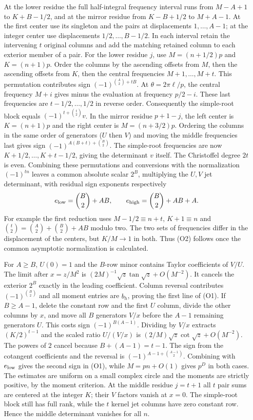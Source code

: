\documentclass[11pt,a4paper]{article}
\begin{document}
At the lower residue the full half-integral frequency interval runs from $M-A+1$ to $K+B-1/2$, and at the mirror residue from $K-B+1/2$ to $M+A-1$. At the first center use its singleton and the pairs at displacements $1,\ldots,A-1$; at the integer center use displacements $1/2,\ldots,B-1/2$. In each interval retain the intervening $t$ original columns and add the matching retained column to each exterior member of a pair. For the lower residue $j$, use $M=(n+1/2)p$ and $K=(n+1)p$. Order the columns by the ascending offsets from $M$, then the ascending offsets from $K$, then the central frequencies $M+1,\ldots,M+t$. This permutation contributes sign $(-1)^{\binom A2+tB}$. At $\theta=2\pi\ell/p$, the central frequency $M+i$ gives minus the evaluation at frequency $p/2-i$. These last frequencies are $t-1/2,\ldots,1/2$ in reverse order. Consequently the simple-root block equals $(-1)^{t+\binom t2}v$. In the mirror residue $p+1-j$, the left center is $K=(n+1)p$ and the right center is $M=(n+3/2)p$. Ordering the columns in the same order of generators ($U$ then $V$) and moving the middle frequencies last gives sign $(-1)^{A(B+t)+\binom B2}$. The simple-root frequencies are now $K+1/2,\ldots,K+t-1/2$, giving the determinant $v$ itself. The Christoffel degree $2t$ is even. Combining these permutations and conversions with the normalization $(-1)^{tn}$ leaves a common absolute scalar $2^B$, multiplying the $U,V$ jet determinant, with residual sign exponents respectively
\[
 e_{\rm low}=\binom B2+AB,\qquad
 e_{\rm high}=\binom B2+AB+A .
\]
For example the first reduction uses $M-1/2\equiv n+t$, $K+1\equiv n$ and $\binom t2=\binom A2+\binom B2+AB$ modulo two. The two sets of frequencies differ in the displacement of the centers, but $K/M\to1$ in both. Thus (O2) follows once the common asymptotic normalization is calculated.

For $A\ge B$, $U(0)=1$ and the $B$-row minor contains Taylor coefficients of $V/U$. The limit after $x=z/M^2$ is $(2M)^{-1}\sqrt z\tan\sqrt z+O(M^{-2})$. It cancels the exterior $2^B$ exactly in the leading coefficient. Column reversal contributes $(-1)^{\binom B2}$ and all moment entries are $b_h$, proving the first line of (O1). If $B\ge A-1$, delete the constant row and the first $U$ column, divide the other columns by $x$, and move all $B$ generators $V/x$ before the $A-1$ remaining generators $U$. This costs sign $(-1)^{B(A-1)}$. Dividing by $V/x$ extracts $(K/2)^{t-1}$ and the scaled ratio $U/(V/x)$ is $(2/M)\sqrt z\cot\sqrt z+O(M^{-2})$. The powers of $2$ cancel because $B+(A-1)=t-1$. The sign from the cotangent coefficients and the reversal is $(-1)^{A-1+\binom{A-1}{2}}$. Combining with $e_{\rm low}$ gives the second sign in (O1), while $M=pn+O(1)$ gives $p^D$ in both cases. The estimates are uniform on a small complex circle and the moments are strictly positive, by the moment criterion. At the middle residue $j=t+1$ all $t$ pair sums are centered at the integer $K$; their $V$ factors vanish at $x=0$. The simple-root block still has full rank, while the $t$ kernel jet columns have zero constant row. Hence the middle determinant vanishes for all $n$.
\end{document}
